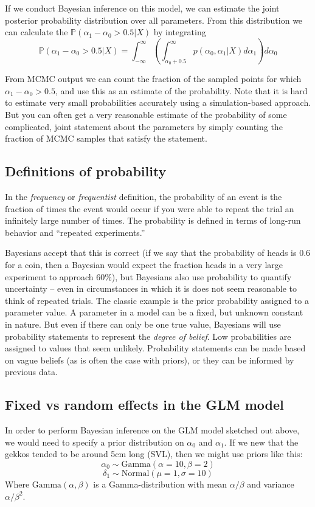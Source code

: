 \documentclass[11pt]{article}
\renewcommand{\Pr}{{\mathbb P}}
\begin{document}
If we conduct Bayesian inference on this model, we can estimate the joint posterior probability distribution over all parameters.
From this distribution we can calculate the $\Pr(\alpha_1 - \alpha_0 > 0.5|X)$ by integrating 
$$\Pr(\alpha_1 - \alpha_0 > 0.5|X) = \int_{-\infty}^{\infty}\left(\int_{\alpha_0 + 0.5}^{\infty}p(\alpha_0, \alpha_1|X) d \alpha_1\right)d\alpha_0 $$

From MCMC output we can count the fraction of the sampled points for which $\alpha_1 - \alpha_0 > 0.5$, and use this as an estimate of the probability.
Note that it is hard to estimate very small probabilities accurately using a simulation-based approach.  
But you can often get a very reasonable estimate of the probability of some complicated, joint statement about the parameters by simply counting the fraction of MCMC samples that satisfy the statement.

\subsection*{Definitions of probability}
In the {\em frequency} or {\em frequentist} definition, the probability of an event is the fraction of times the event would occur if you were able to repeat the trial an infinitely large number of times.  The probability is defined in terms of long-run behavior and ``repeated experiments.''

Bayesians accept that this is correct (if we say that the probability of heads is 0.6 for a coin, then a Bayesian would expect the fraction heads in a very large experiment to approach 60\%), but Bayesians also use probability to quantify uncertainty -- even in circumstances in which it is does not seem reasonable to think of repeated trials.
The classic example is the prior probability assigned to a parameter value.
A parameter in a model can be a fixed, but unknown constant in nature.
But even if there can only be one true value, Bayesians will use probability statements to represent the {\em degree of belief}.
Low probabilities are assigned to values that seem unlikely.
Probability statements can be made based on vague beliefs (as is often the case with priors), or they can be informed by previous data.

\subsection*{Fixed vs random effects in the GLM model}
In order to perform Bayesian inference on the GLM model sketched out above, we would need to specify a prior distribution on $\alpha_0$ and $\alpha_1$.
If we new that the gekkos tended to be around 5cm long (SVL), then we might use priors like this:
$$\alpha_0 \sim \mbox{Gamma}(\alpha=10, \beta=2)$$
$$\delta_1 \sim \mbox{Normal}(\mu=1, \sigma=10)$$
Where $\mbox{Gamma}(\alpha, \beta)$ is a Gamma-distribution with mean $\alpha/\beta$ and variance $\alpha/\beta^2$.
\end{document}
